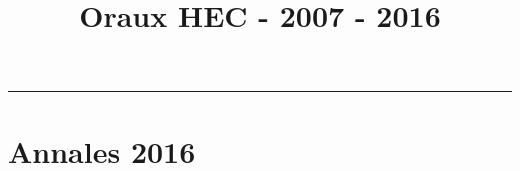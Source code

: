 \documentclass[11pt]{article}%
\title{Oraux HEC - 2007 - 2016} %
\author{} %
\date{} %
\begin{document}
 \maketitle %
 \vspace{-1.6cm}\hrule %
 \thispagestyle{fancy}

 \vspace*{1cm}


 \section{Annales 2016}


\end{document}
